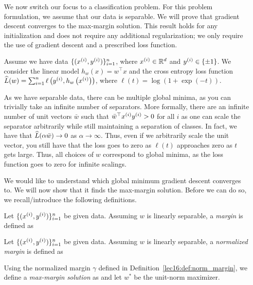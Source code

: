 We now switch our focus to a classification problem. For this problem formulation, we assume that our data is separable. We will prove that gradient descent converges to the max-margin solution. This result holds for any initialization and does not require any additional regularization; we only require the use of gradient descent and a prescribed loss function.

Assume we have data \(\{(x\sp{i}, y\sp{i}) \}_{i=1}^n \), where \(x\sp{i} \in \R^d\) and \(y\sp{i} \in \{\pm 1 \}\). We consider the linear model \( h_w(x) = w^\top x\) and the cross entropy loss function \(\hatL (w) = \sum_{i=1}^n \ell\left(y\sp{i}, h_w\l (x\sp{i} \r )\right)\), where \( \ell(t) = \log(1 + \exp(-t))\).

As we have separable data, there can be multiple global minima, as you can trivially take an infinite number of separators. More formally, there are an infinite number of unit vectors \(\bar{w}\) such that $\bar{w}^\top x\sp{i} y\sp{i} > 0$ for all $i$ as one can scale the separator arbitrarily while still maintaining a separation of classes. In fact, we have that \( \hatL(\alpha \bar{w}) \to 0\) as \( \alpha \to \infty\). Thus, even if we arbitrarily scale the unit vector, you still have that the loss goes to zero as \(\ell(t)\) approaches zero as \(t\) gets large. Thus, all choices of $w$ correspond to global minima, as the loss function goes to zero for infinite scalings.

We would like to understand which global minimum gradient descent converges to. We will now show that it finds the max-margin solution. Before we can do so, we recall/introduce the following definitions.

\begin{definition}[Margin]
Let \(\{(x\sp{i}, y\sp{i}) \}_{i=1}^n \) be given data. Assuming \(w\) is linearly separable, a \textit{margin} is defined as
\end{definition}

\begin{definition}\label{lec16:def:norm_margin}
Let \(\{(x\sp{i}, y\sp{i}) \}_{i=1}^n \) be given data. Assuming \( w\) is linearly separable, a \textit{normalized margin} is defined as
\end{definition}

\begin{definition}
Using the normalized margin \(\gamma\) defined in Definition~\ref{lec16:def:norm_margin}, we define a \textit{max-margin solution} as
and let \(w^*\) be the unit-norm maximizer.
\end{definition}

